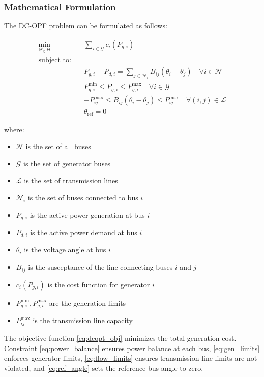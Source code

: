 \documentclass{article}
\begin{document}
\subsubsection{Mathematical Formulation}
The DC-OPF problem can be formulated as follows:

\begin{align}
    \min_{\mathbf{P_g}, \boldsymbol{\theta}} \quad & \sum_{i \in \mathcal{G}} c_i(P_{g,i}) \label{eq:dcopt_obj} \\
    \text{subject to:} \quad & \nonumber \\
    & P_{g,i} - P_{d,i} = \sum_{j \in \mathcal{N}_i} B_{ij}(\theta_i - \theta_j) \quad \forall i \in \mathcal{N} \label{eq:power_balance} \\
    & P_{g,i}^{\min} \leq P_{g,i} \leq P_{g,i}^{\max} \quad \forall i \in \mathcal{G} \label{eq:gen_limits} \\
    & -P_{ij}^{\max} \leq B_{ij}(\theta_i - \theta_j) \leq P_{ij}^{\max} \quad \forall (i,j) \in \mathcal{L} \label{eq:flow_limits} \\
    & \theta_{\text{ref}} = 0 \label{eq:ref_angle}
\end{align}

where:
\begin{itemize}
    \item $\mathcal{N}$ is the set of all buses
    \item $\mathcal{G}$ is the set of generator buses
    \item $\mathcal{L}$ is the set of transmission lines
    \item $\mathcal{N}_i$ is the set of buses connected to bus $i$
    \item $P_{g,i}$ is the active power generation at bus $i$
    \item $P_{d,i}$ is the active power demand at bus $i$
    \item $\theta_i$ is the voltage angle at bus $i$
    \item $B_{ij}$ is the susceptance of the line connecting buses $i$ and $j$
    \item $c_i(P_{g,i})$ is the cost function for generator $i$
    \item $P_{g,i}^{\min}, P_{g,i}^{\max}$ are the generation limits
    \item $P_{ij}^{\max}$ is the transmission line capacity
\end{itemize}

The objective function \eqref{eq:dcopt_obj} minimizes the total generation cost. Constraint \eqref{eq:power_balance} ensures power balance at each bus, \eqref{eq:gen_limits} enforces generator limits, \eqref{eq:flow_limits} ensures transmission line limits are not violated, and \eqref{eq:ref_angle} sets the reference bus angle to zero.
\end{document}
